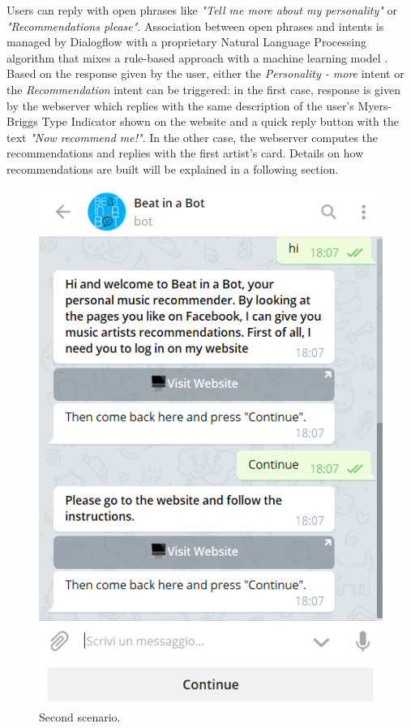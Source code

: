 \documentclass[b5paper,10pt,twoside,cucitura]{toptesi}
\begin{document}
\noindent
Users can reply with open phrases like \textit{"Tell me more about my personality"} or \textit{"Recommendations please"}. Association between open phrases and intents is managed by Dialogflow with a proprietary Natural Language Processing algorithm that mixes a rule-based approach with a machine learning model   \citep{dialogflowML}. Based on the response given by the user, either the \textit{Personality - more} intent or the \textit{Recommendation} intent can be triggered: in the first case, response is given by the webserver which replies with the same description of the user's Myers-Briggs Type Indicator shown on the website and a quick reply button with the text \textit{"Now recommend me!"}. In the other case, the webserver computes the recommendations and replies with the first artist's card. Details on how recommendations are built will be explained in a following section.

\pagebreak

\begin{figure}[ht]
\centering
\includegraphics[scale=0.6]{bot_error.png}
\caption{Second scenario.}
\end{figure}
\end{document}
